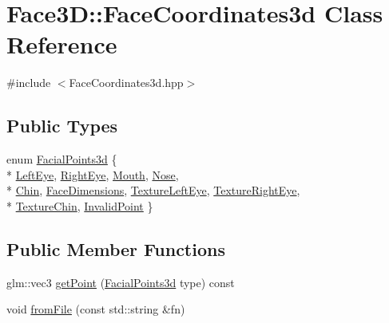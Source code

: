 \hypertarget{class_face3_d_1_1_face_coordinates3d}{}\section{Face3D\+:\+:Face\+Coordinates3d Class Reference}
\label{class_face3_d_1_1_face_coordinates3d}


{\ttfamily \#include $<$Face\+Coordinates3d.\+hpp$>$}

\subsection*{Public Types}
\begin{DoxyCompactItemize}
\item 
enum \hyperlink{class_face3_d_1_1_face_coordinates3d_a8bedd28eb0ab2749aa98a888921ea2b2}{Facial\+Points3d} \{ \\*
\hyperlink{class_face3_d_1_1_face_coordinates3d_a8bedd28eb0ab2749aa98a888921ea2b2ae46fc9712285f861bf9db6cdca3b6f9d}{Left\+Eye}, 
\hyperlink{class_face3_d_1_1_face_coordinates3d_a8bedd28eb0ab2749aa98a888921ea2b2a92625dad6ca65ec8758fe9cf1652997b}{Right\+Eye}, 
\hyperlink{class_face3_d_1_1_face_coordinates3d_a8bedd28eb0ab2749aa98a888921ea2b2a39e45eff70c506fc33d410cc68ccb22b}{Mouth}, 
\hyperlink{class_face3_d_1_1_face_coordinates3d_a8bedd28eb0ab2749aa98a888921ea2b2a36a8ea194a9ac6523814f63beb63ae8a}{Nose}, 
\\*
\hyperlink{class_face3_d_1_1_face_coordinates3d_a8bedd28eb0ab2749aa98a888921ea2b2aeded0d266c30279d479ff6dd8a6c32cf}{Chin}, 
\hyperlink{class_face3_d_1_1_face_coordinates3d_a8bedd28eb0ab2749aa98a888921ea2b2a6c7721a39f6ff60dfa7bc73948d3bb05}{Face\+Dimensions}, 
\hyperlink{class_face3_d_1_1_face_coordinates3d_a8bedd28eb0ab2749aa98a888921ea2b2a08b652a6b7f4c583c7258b277d12e861}{Texture\+Left\+Eye}, 
\hyperlink{class_face3_d_1_1_face_coordinates3d_a8bedd28eb0ab2749aa98a888921ea2b2a65806d3ace05500db0e7e7150d23948f}{Texture\+Right\+Eye}, 
\\*
\hyperlink{class_face3_d_1_1_face_coordinates3d_a8bedd28eb0ab2749aa98a888921ea2b2ab3a011fe9e727dda63bb64a700ae52e8}{Texture\+Chin}, 
\hyperlink{class_face3_d_1_1_face_coordinates3d_a8bedd28eb0ab2749aa98a888921ea2b2a7a89277f3a276a2c9c008860d4e73e99}{Invalid\+Point}
 \}
\end{DoxyCompactItemize}
\subsection*{Public Member Functions}
\begin{DoxyCompactItemize}
\item 
glm\+::vec3 \hyperlink{class_face3_d_1_1_face_coordinates3d_aac912dcbb5db9d5ea1d6ca754afa5a39}{get\+Point} (\hyperlink{class_face3_d_1_1_face_coordinates3d_a8bedd28eb0ab2749aa98a888921ea2b2}{Facial\+Points3d} type) const 
\item 
void \hyperlink{class_face3_d_1_1_face_coordinates3d_a1c44e33ec6cd6c54c119d2a2ec4b49e7}{from\+File} (const std\+::string \&fn)
\end{DoxyCompactItemize}
